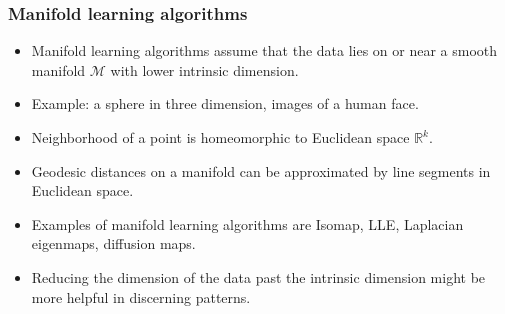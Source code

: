 \documentclass[professionalfonts,hyperref={colorlinks=true,linkcolor=red}]{beamer}
\begin{document}
\begin{frame}
  \frametitle{Manifold learning algorithms}
  \begin{itemize}[<+->]
  \item Manifold learning algorithms assume that the data lies on or
    near a smooth manifold $\mathcal{M}$ with lower intrinsic
    dimension. 
  \item Example: a sphere in three dimension, images of a human face.  
  \item Neighborhood of a point is homeomorphic to Euclidean space
    $\mathbb{R}^{k}$.  
  \item Geodesic distances on a manifold can be approximated by
    line segments in Euclidean space. 
  \item Examples of manifold learning algorithms are Isomap, LLE,
    Laplacian eigenmaps, diffusion maps.
  \item Reducing the dimension of the data past the intrinsic
    dimension might be more helpful in discerning patterns. 
  \end{itemize}
\end{frame}
\end{document}
